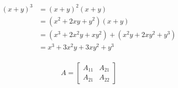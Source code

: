 \documentclass[paper=a4, fontsize=11pt]{scrartcl}
\numberwithin{equation}{section}		%
\numberwithin{figure}{section}			%
\numberwithin{table}{section}			%
\begin{document}
	\begin{align} 
	\begin{split}
	(x+y)^3 	&= (x+y)^2(x+y)\\
	&=(x^2+2xy+y^2)(x+y)\\
	&=(x^3+2x^2y+xy^2) + (x^2y+2xy^2+y^3)\\
	&=x^3+3x^2y+3xy^2+y^3
	\end{split}					
	\end{align}
	
	\begin{align}
	A = 
	\begin{bmatrix}
	A_{11} & A_{21} \\
	A_{21} & A_{22}
	\end{bmatrix}
	\end{align}
	



\end{document}
